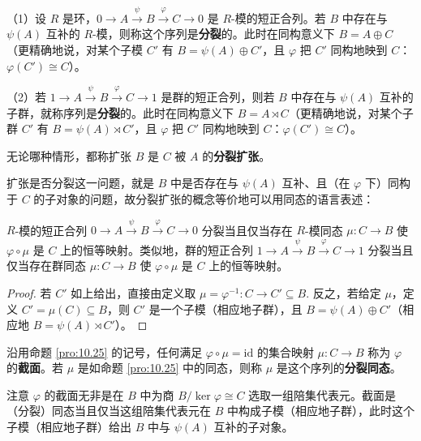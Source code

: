 \begin{definition}
（1）设 \(R\) 是环，\(0 \to A \xrightarrow{\psi} B \xrightarrow{\varphi} C \to 0\) 是 \(R\)-模的短正合列。若 \(B\) 中存在与 \(\psi(A)\) 互补的 \(R\)-模，则称这个序列是\textbf{分裂}的。此时在同构意义下 \(B = A \oplus C\)（更精确地说，对某个子模 \(C'\) 有 \(B = \psi(A) \oplus C'\)，且 \(\varphi\) 把 \(C'\) 同构地映到 \(C\)：\(\varphi(C') \cong C\)）。

（2）若 \(1 \to A \xrightarrow{\psi} B \xrightarrow{\varphi} C \to 1\) 是群的短正合列，则若 \(B\) 中存在与 \(\psi(A)\) 互补的子群，就称序列是\textbf{分裂}的。此时在同构意义下 \(B = A \rtimes C\)（更精确地说，对某个子群 \(C'\) 有 \(B = \psi(A) \rtimes C'\)，且 \(\varphi\) 把 \(C'\) 同构地映到 \(C\)：\(\varphi(C') \cong C\)）。
\end{definition}

无论哪种情形，都称扩张 \(B\) 是 \(C\) 被 \(A\) 的\textbf{分裂扩张}。

扩张是否分裂这一问题，就是 \(B\) 中是否存在与 \(\psi(A)\) 互补、且（在 \(\varphi\) 下）同构于 \(C\) 的子对象的问题，故分裂扩张的概念等价地可以用同态的语言表述：

\begin{proposition}\label{pro:10.25}
\(R\)-模的短正合列 \(0 \to A \xrightarrow{\psi} B \xrightarrow{\varphi} C \to 0\) 分裂当且仅当存在 \(R\)-模同态 \(\mu : C \to B\) 使 \(\varphi \circ \mu\) 是 \(C\) 上的恒等映射。类似地，群的短正合列 \(1 \to A \xrightarrow{\psi} B \xrightarrow{\varphi} C \to 1\) 分裂当且仅当存在群同态 \(\mu : C \to B\) 使 \(\varphi \circ \mu\) 是 \(C\) 上的恒等映射。
\end{proposition}

\begin{proof}
若 \(C'\) 如上给出，直接由定义取 \(\mu = \varphi^{-1} : C \to C' \subseteq B\). 反之，若给定 \(\mu\)，定义 \(C' = \mu(C) \subseteq B\)，则 \(C'\) 是一个子模（相应地子群），且 \(B = \psi(A) \oplus C'\)（相应地 \(B = \psi(A) \rtimes C'\)）。
\end{proof}

\begin{definition}
沿用命题 \ref{pro:10.25} 的记号，任何满足 \(\varphi \circ \mu = \mathrm{id}\) 的集合映射 \(\mu : C \to B\) 称为 \(\varphi\) 的\textbf{截面}。若 \(\mu\) 是如命题 \ref{pro:10.25} 中的同态，则称 \(\mu\) 是这个序列的\textbf{分裂同态}。
\end{definition}

注意 \(\varphi\) 的截面无非是在 \(B\) 中为商 \(B/\ker\varphi \cong C\) 选取一组陪集代表元。截面是（分裂）同态当且仅当这组陪集代表元在 \(B\) 中构成子模（相应地子群），此时这个子模（相应地子群）给出 \(B\) 中与 \(\psi(A)\) 互补的子对象。

